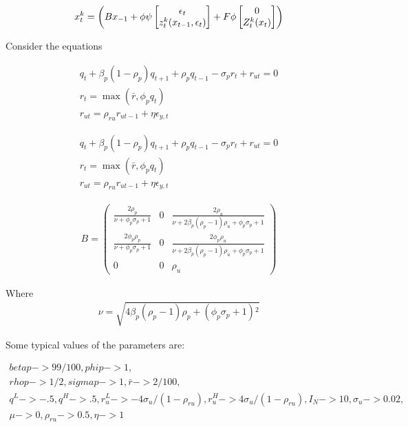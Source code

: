 \documentclass[12pt]{article}
\begin{document}
\begin{gather*}
  x_t^k=
\left (
B x_{-1} + \phi \psi \begin{bmatrix} \epsilon_t \\z^k_{t}(x_{t-1},\epsilon_t) \end{bmatrix}+ F \phi \begin{bmatrix} 0 \\Z_t^k(x_{t}) \end{bmatrix}
\right )
\end{gather*}

Consider the equations 

\begin{gather*}
q_{t} +\beta_p(1 - \rho_p)q_{t + 1} + \rho_pq_{t - 1} - \sigma_pr_{t} +
     r_{ut}=0\\
 r_{t} = \max (\bar{r}, \phi_pq_{t}) \\
 r_{ut} = \rho_{ru} r_{ut - 1} + \eta \epsilon_{y,t}
\end{gather*}



\begin{gather*}
q_{t} +\beta_p(1 - \rho_p)q_{t + 1} + \rho_pq_{t - 1} - \sigma_pr_{t} +
     r_{ut}=0\\
 r_{t} = \max (\bar{r}, \phi_pq_{t}) \\
 r_{ut} = \rho_{ru} r_{ut - 1} + \eta \epsilon_{y,t}
\end{gather*}


\begin{gather*}
  B=   \left(
   \begin{array}{ccc}
    \frac{2 \rho _p}{\nu +\phi _p \sigma _p+1} & 0 & \frac{2 \rho _u}{\nu +2
      \beta _p \left(\rho _p-1\right) \rho _u+\phi _p \sigma _p+1} \\
    \frac{2 \phi _p \rho _p}{\nu +\phi _p \sigma _p+1} & 0 & \frac{2 \phi _p
      \rho _u}{\nu +2 \beta _p \left(\rho _p-1\right) \rho _u+\phi _p \sigma
      _p+1} \\
    0 & 0 & \rho _u
   \end{array}
   \right)
\end{gather*}

Where
\begin{gather*}
  \nu=    \sqrt{4 \beta _p \left(\rho _p-1\right) \rho _p+\left(\phi _p \sigma
    _p+1\right){}^2}
\end{gather*}

\newcommand{\tVec}{
  \begin{bmatrix}
    q_t\\r_{rt}\\r_{ut}
  \end{bmatrix}}

Some typical values of the parameters are:

\begin{gather*}
  betap -> 99/100, phip -> 1, \\
rhop -> 1/2, sigmap -> 1, 
  \bar{r} -> 2/100, \\
q^L -> -.5, q^H -> .5, 
  r_u^L -> -4 \sigma_u/(1 - \rho_{ru}), r_u^H->  4\sigma_u/(1 - \rho_{ru}),
   I_N -> {10}, \sigma_u -> 0.02,\\
 \mu -> {0},\rho_{ru} -> 0.5,
   \eta -> 1
\end{gather*}
\end{document}
